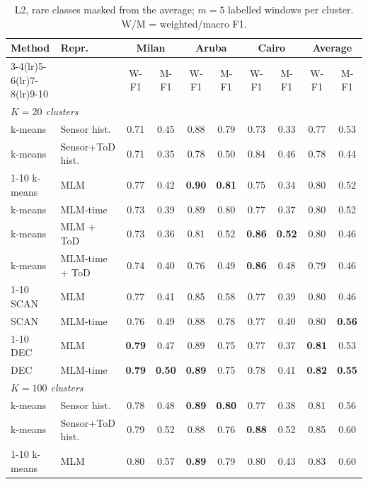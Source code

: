 \begin{table}[t]
\centering\small
\caption{L2, rare classes masked from the average; $m=5$ labelled windows per cluster. W/M = weighted/macro F1.}
\label{tab:l2_masked_m5}
\setlength{\tabcolsep}{4pt}
\begin{tabular}{llcccccc|cc}
\toprule
Method & Repr. & \multicolumn{2}{c}{Milan} & \multicolumn{2}{c}{Aruba} & \multicolumn{2}{c}{Cairo} & \multicolumn{2}{c}{Average} \\
\cmidrule(lr){3-4}\cmidrule(lr){5-6}\cmidrule(lr){7-8}\cmidrule(lr){9-10}
 & & W-F1 & M-F1 & W-F1 & M-F1 & W-F1 & M-F1 & W-F1 & M-F1 \\
\midrule
\multicolumn{10}{l}{\textit{$K = 20$ clusters}} \\
\midrule
k-means & Sensor hist. & 0.71 & 0.45 & 0.88 & 0.79 & 0.73 & 0.33 & 0.77 & 0.53 \\
k-means & Sensor+ToD hist. & 0.71 & 0.35 & 0.78 & 0.50 & 0.84 & 0.46 & 0.78 & 0.44 \\
\cmidrule{1-10}
k-means & MLM & 0.77 & 0.42 & \textbf{0.90} & \textbf{0.81} & 0.75 & 0.34 & 0.80 & 0.52 \\
k-means & MLM-time & 0.73 & 0.39 & 0.89 & 0.80 & 0.77 & 0.37 & 0.80 & 0.52 \\
k-means & MLM + ToD & 0.73 & 0.36 & 0.81 & 0.52 & \textbf{0.86} & \textbf{0.52} & 0.80 & 0.46 \\
k-means & MLM-time + ToD & 0.74 & 0.40 & 0.76 & 0.49 & \textbf{0.86} & 0.48 & 0.79 & 0.46 \\
\cmidrule{1-10}
SCAN & MLM & 0.77 & 0.41 & 0.85 & 0.58 & 0.77 & 0.39 & 0.80 & 0.46 \\
SCAN & MLM-time & 0.76 & 0.49 & 0.88 & 0.78 & 0.77 & 0.40 & 0.80 & \textbf{0.56} \\
\cmidrule{1-10}
DEC & MLM & \textbf{0.79} & 0.47 & 0.89 & 0.75 & 0.77 & 0.37 & \textbf{0.81} & 0.53 \\
DEC & MLM-time & \textbf{0.79} & \textbf{0.50} & \textbf{0.89} & 0.75 & 0.78 & 0.41 & \textbf{0.82} & \textbf{0.55} \\
\midrule
\multicolumn{10}{l}{\textit{$K = 100$ clusters}} \\
\midrule
k-means & Sensor hist. & 0.78 & 0.48 & \textbf{0.89} & \textbf{0.80} & 0.77 & 0.38 & 0.81 & 0.56 \\
k-means & Sensor+ToD hist. & 0.79 & 0.52 & 0.88 & 0.76 & \textbf{0.88} & 0.52 & 0.85 & 0.60 \\
\cmidrule{1-10}
k-means & MLM & 0.80 & 0.57 & \textbf{0.89} & 0.79 & 0.80 & 0.43 & 0.83 & 0.60 \\

\end{tabular}
\end{table}
